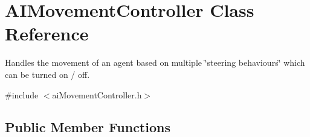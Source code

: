 \hypertarget{classAIMovementController}{
\section{\-A\-I\-Movement\-Controller \-Class \-Reference}
\label{d2/d30/classAIMovementController}
}


\-Handles the movement of an agent based on multiple \char`\"{}steering behaviours\char`\"{} which can be turned on / off.  




{\ttfamily \#include $<$ai\-Movement\-Controller.\-h$>$}

\subsection*{\-Public \-Member \-Functions}

